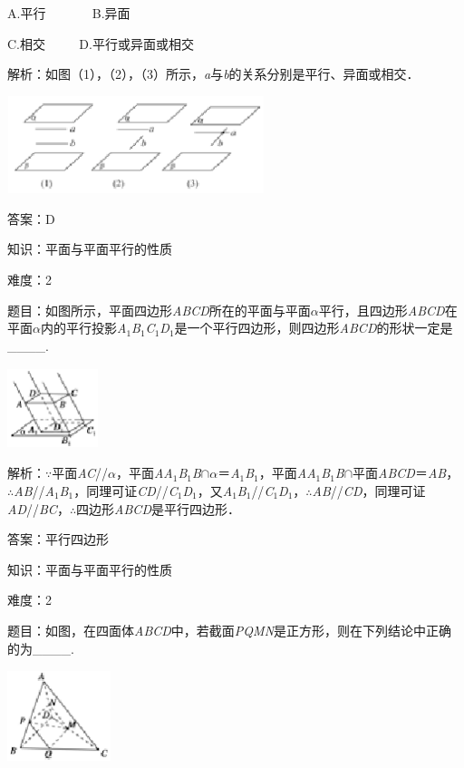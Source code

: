 \documentclass{article} %
\begin{document}
A.平行 　　　  B.异面

C.相交  　　  D.平行或异面或相交

解析：如图（1），（2），（3）所示，\textit{a}与\textit{b}的关系分别是平行、异面或相交．

\includegraphics*[width=2.95in, height=1.12in, keepaspectratio=false]{image187}

答案：D


知识：平面与平面平行的性质

难度：2

题目：如图所示，平面四边形\textit{ABCD}所在的平面与平面\textit{$\alpha$}平行，且四边形\textit{ABCD}在平面\textit{$\alpha$}内的平行投影\textit{A}${}_{1}$\textit{B}${}_{1}$\textit{C}${}_{1}$\textit{D}${}_{1}$是一个平行四边形，则四边形\textit{ABCD}的形状一定是\_\_\_\_.

\includegraphics*[width=1.04in, height=0.92in, keepaspectratio=false]{image188}

解析：$\mathrm{\because}$平面\textit{AC}//\textit{$\alpha$}，平面\textit{AA}${}_{1}$\textit{B}${}_{1}$\textit{B}$\mathrm{\cap}$\textit{$\alpha$}＝\textit{A}${}_{1}$\textit{B}${}_{1}$，平面\textit{AA}${}_{1}$\textit{B}${}_{1}$\textit{B}$\mathrm{\cap}$平面\textit{ABCD}＝\textit{AB}，$\mathrm{\therefore}$\textit{AB}//\textit{A}${}_{1}$\textit{B}${}_{1}$，同理可证\textit{CD}//\textit{C}${}_{1}$\textit{D}${}_{1}$，又\textit{A}${}_{1}$\textit{B}${}_{1}$//\textit{C}${}_{1}$\textit{D}${}_{1}$，$\mathrm{\therefore}$\textit{AB}//\textit{CD}，同理可证\textit{AD}//\textit{BC}，$\mathrm{\therefore}$四边形\textit{ABCD}是平行四边形．

答案：平行四边形

知识：平面与平面平行的性质

难度：2

题目：如图，在四面体\textit{ABCD}中，若截面\textit{PQMN}是正方形，则在下列结论中正确的为\_\_\_\_.

\includegraphics*[width=1.19in, height=1.05in, keepaspectratio=false]{image189}
\end{document}
